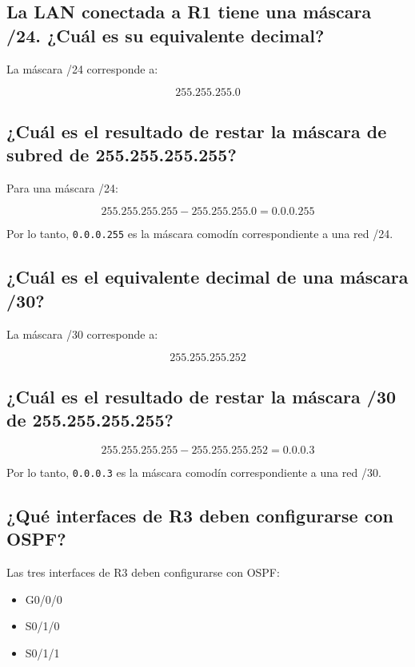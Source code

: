 \documentclass[12pt,a4paper]{article}
\begin{document}
\subsection{La LAN conectada a R1 tiene una máscara /24. ¿Cuál es su
equivalente decimal?}

La máscara /24 corresponde a:

\[
\boxed{255.255.255.0}
\]

\subsection{¿Cuál es el resultado de restar la máscara de subred de
255.255.255.255?}

Para una máscara /24:

\[
255.255.255.255 - 255.255.255.0
=
\boxed{0.0.0.255}
\]

Por lo tanto, \texttt{0.0.0.255} es la máscara comodín correspondiente
a una red /24.

\subsection{¿Cuál es el equivalente decimal de una máscara /30?}

La máscara /30 corresponde a:

\[
\boxed{255.255.255.252}
\]

\subsection{¿Cuál es el resultado de restar la máscara /30 de
255.255.255.255?}

\[
255.255.255.255 - 255.255.255.252
=
\boxed{0.0.0.3}
\]

Por lo tanto, \texttt{0.0.0.3} es la máscara comodín correspondiente a
una red /30.

\subsection{¿Qué interfaces de R3 deben configurarse con OSPF?}

Las tres interfaces de R3 deben configurarse con OSPF:

\begin{itemize}
    \item G0/0/0
    \item S0/1/0
    \item S0/1/1
\end{itemize}
\end{document}
